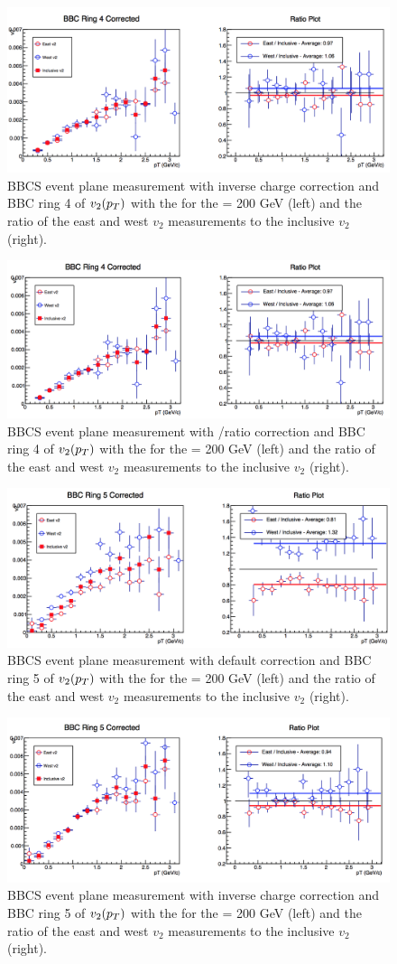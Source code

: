 \begin{figure}[!ht]
\centering
\includegraphics[width=0.65\linewidth]{figs/bbc_4_data.png}
\caption{BBCS event plane measurement with inverse charge correction and BBC ring 4 of $v_{2}(\mbox{$p_T$})$ with the  for the \pau \sqsn = 200 GeV (left) and the ratio of the east and west $v_2$ measurements to the inclusive $v_2$ (right).}
\end{figure}

\begin{figure}[!ht]
\centering
\includegraphics[width=0.65\linewidth]{figs/bbc_4_pp.png}
\caption{BBCS event plane measurement with \pp/\pau ratio correction and BBC ring 4 of $v_{2}(\mbox{$p_T$})$ with the  for the \pau \sqsn = 200 GeV (left) and the ratio of the east and west $v_2$ measurements to the inclusive $v_2$ (right).}
\end{figure}

\begin{figure}[!ht]
\centering
\includegraphics[width=0.65\linewidth]{figs/bbc_5_default.png}
\caption{BBCS event plane measurement with default correction and BBC ring 5 of $v_{2}(\mbox{$p_T$})$ with the  for the \pau \sqsn = 200 GeV (left) and the ratio of the east and west $v_2$ measurements to the inclusive $v_2$ (right).}
\end{figure}

\begin{figure}[!ht]
\centering
\includegraphics[width=0.65\linewidth]{figs/bbc_5_data.png}
\caption{BBCS event plane measurement with inverse charge correction and BBC ring 5 of $v_{2}(\mbox{$p_T$})$ with the  for the \pau \sqsn = 200 GeV (left) and the ratio of the east and west $v_2$ measurements to the inclusive $v_2$ (right).}
\end{figure}

